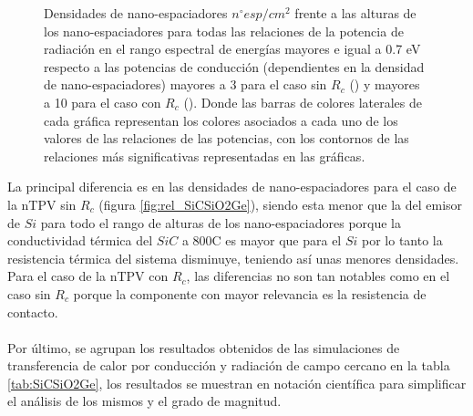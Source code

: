 \begin{figure}[H]
\begin{subfigure}[b]{0.49\textwidth}
		\caption{ }
		\label{fig:rel_SiCSiO2Ge_Rc}
	\end{subfigure}
	\caption{Densidades de nano-espaciadores $n^{\circ}esp/cm^2$ frente a las alturas de los nano-espaciadores para todas las relaciones de la potencia de radiación en el rango espectral de energías mayores e igual a 0.7 eV respecto a las potencias de conducción (dependientes en la densidad de nano-espaciadores) mayores a 3 para el caso sin $R_c$ () y mayores a 10 para el caso con $R_c$ (). Donde las barras de colores laterales de cada gráfica representan los colores asociados a cada uno de los valores de las relaciones de las potencias, con los contornos de las relaciones más significativas representadas en las gráficas.}
	\label{fig:relation_SiCSiO2Ge}
\end{figure}
La principal diferencia es en las densidades de nano-espaciadores para el caso de la nTPV sin $R_c$ (figura \ref{fig:rel_SiCSiO2Ge}), siendo esta menor que la del emisor de $Si$ para todo el rango de alturas de los nano-espaciadores porque la conductividad térmica del $SiC$ a 800\textdegree C es mayor que para el $Si$ por lo tanto la resistencia térmica del sistema disminuye, teniendo así unas menores densidades. Para el caso de la nTPV con $R_c$, las diferencias no son tan notables como en el caso sin $R_c$ porque la componente con mayor relevancia es la resistencia de contacto.\\\\
Por último, se agrupan los resultados obtenidos de las simulaciones de transferencia de calor por conducción y radiación de campo cercano en la tabla \ref{tab:SiCSiO2Ge}, los resultados se muestran en notación científica para simplificar el análisis de los mismos y el grado de magnitud.
